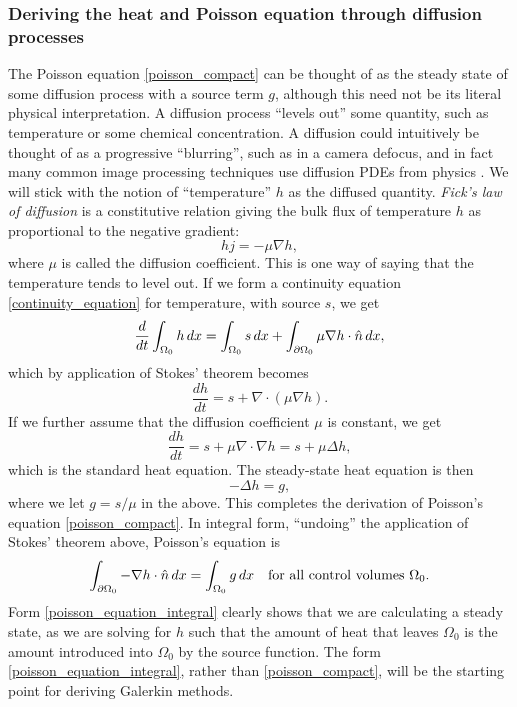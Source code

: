 \subsubsection{Deriving the heat and Poisson equation through diffusion processes}
The Poisson equation \eqref{poisson_compact} can be thought of as the steady state of some diffusion process with a source term $g$,
although this need not be its literal physical interpretation.
A diffusion process ``levels out'' some quantity, such as temperature or some chemical concentration.
A diffusion could intuitively be thought of as a
progressive ``blurring'',
such as in a camera defocus, and in fact many common image processing techniques use diffusion PDEs from physics \cite{tum}. We will stick with
the notion of ``temperature'' $h$ as the diffused quantity.
\textit{Fick's law of diffusion} is a constitutive relation giving the bulk flux of temperature $h$ as proportional to the negative gradient:
    $$hj = -\mu\nabla h,$$
where $\mu$ is called the diffusion coefficient.
This is one way of saying that the temperature tends to level out.
If we form a continuity equation \eqref{continuity_equation} for temperature, with source $s$, we get
\begin{equation}\label{heat_equation_integral}
    \frac{d}{dt} \int_{\Omega_0} h\,dx = \int_{\Omega_0} s\,dx + \int_{{\partial\Omega_0}} \mu \nabla h \cdot \hat{n}\,dx,
\end{equation}
which by application of Stokes' theorem becomes
\begin{equation}\label{heat_equation_differential}
    \frac{dh}{dt} = s + \nabla \cdot \left(\mu \nabla h\right).
\end{equation}
If we further assume that the diffusion coefficient $\mu$ is constant, we get
\begin{equation}\label{heat_equation_differential_constant}
    \frac{dh}{dt} = s + \mu\nabla \cdot \nabla h = s + \mu\Delta h,
\end{equation}
which is the standard heat equation.
The steady-state heat equation is then
\begin{equation}\label{poisson_equation}
    -\Delta h = g,
\end{equation}
where we let $g = s/\mu$ in the above.
This completes the derivation of Poisson's equation \eqref{poisson_compact}.
In integral form, ``undoing'' the application of Stokes' theorem above, Poisson's equation is
\begin{equation}\label{poisson_equation_integral}
    \int_{{\partial\Omega_0}} -\nabla h\cdot \hat{n}\,dx = \int_{{\Omega_0}} g\,dx \quad \text{for all control volumes $\Omega_0$.}
\end{equation}
Form \eqref{poisson_equation_integral} clearly shows that we are calculating a steady state,
as we are solving for $h$ such that the amount of heat that leaves $\Omega_0$ is the amount introduced into $\Omega_0$ by the source function.
The form \eqref{poisson_equation_integral}, rather than \eqref{poisson_compact}, will be the starting point for deriving Galerkin methods.

